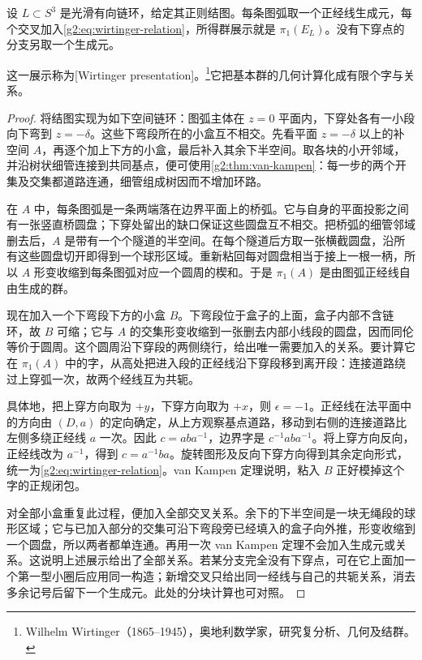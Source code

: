 \begin{theorem}[Wirtinger 展示]\label{g2:thm:wirtinger}
	设 \(L\subset S^3\) 是光滑有向链环，给定其正则结图。每条图弧取一个正经线生成元，每个交叉加入\eqref{g2:eq:wirtinger-relation}，所得群展示就是 \(\pi_1(E_L)\)。没有下穿点的分支另取一个生成元。
\end{theorem}

这一展示称为[Wirtinger presentation]。\footnote{Wilhelm Wirtinger（1865--1945），奥地利数学家，研究复分析、几何及结群。}它把基本群的几何计算化成有限个字与关系。

\begin{proof}
	将结图实现为如下空间链环：图弧主体在 \(z=0\) 平面内，下穿处各有一小段向下弯到 \(z=-\delta\)。这些下弯段所在的小盒互不相交。先看平面 \(z=-\delta\) 以上的补空间 \(A\)，再逐个加上下方的小盒，最后补入其余下半空间。取各块的小开邻域，并沿树状细管连接到共同基点，便可使用\cref{g2:thm:van-kampen}：每一步的两个开集及交集都道路连通，细管组成树因而不增加环路。

	在 \(A\) 中，每条图弧是一条两端落在边界平面上的桥弧。它与自身的平面投影之间有一张竖直桥圆盘；下穿处留出的缺口保证这些圆盘互不相交。把桥弧的细管邻域删去后，\(A\) 是带有一个个隧道的半空间。在每个隧道后方取一张横截圆盘，沿所有这些圆盘切开即得到一个球形区域。重新粘回每对圆盘相当于接上一根一柄，所以 \(A\) 形变收缩到每条图弧对应一个圆周的楔和。于是 \(\pi_1(A)\) 是由图弧正经线自由生成的群。

	现在加入一个下弯段下方的小盒 \(B\)。下弯段位于盒子的上面，盒子内部不含链环，故 \(B\) 可缩；它与 \(A\) 的交集形变收缩到一张删去内部小线段的圆盘，因而同伦等价于圆周。这个圆周沿下穿段的两侧绕行，给出唯一需要加入的关系。要计算它在 \(\pi_1(A)\) 中的字，从高处把进入段的正经线沿下穿段移到离开段：连接道路绕过上穿弧一次，故两个经线互为共轭。

	具体地，把上穿方向取为 \(+y\)，下穿方向取为 \(+x\)，则 \(\epsilon=-1\)。正经线在法平面中的方向由 \((D,a)\) 的定向确定，从上方观察基点道路，移动到右侧的连接道路比左侧多绕正经线 \(a\) 一次。因此 \(c=aba^{-1}\)，边界字是 \(c^{-1}aba^{-1}\)。将上穿方向反向，正经线改为 \(a^{-1}\)，得到 \(c=a^{-1}ba\)。旋转图形及反向下穿方向得到其余定向形式，统一为\eqref{g2:eq:wirtinger-relation}。van Kampen 定理说明，粘入 \(B\) 正好模掉这个字的正规闭包。

	对全部小盒重复此过程，便加入全部交叉关系。余下的下半空间是一块无绳段的球形区域；它与已加入部分的交集可沿下弯段旁已经填入的盒子向外推，形变收缩到一个圆盘，所以两者都单连通。再用一次 van Kampen 定理不会加入生成元或关系。这说明上述展示给出了全部关系。若某分支完全没有下穿点，可在它上面加一个第一型小圈后应用同一构造；新增交叉只给出同一经线与自己的共轭关系，消去多余记号后留下一个生成元。此处的分块计算也可对照\cite[第3章D节，第56--61页]{Rolfsen2003Knots}。
\end{proof}

